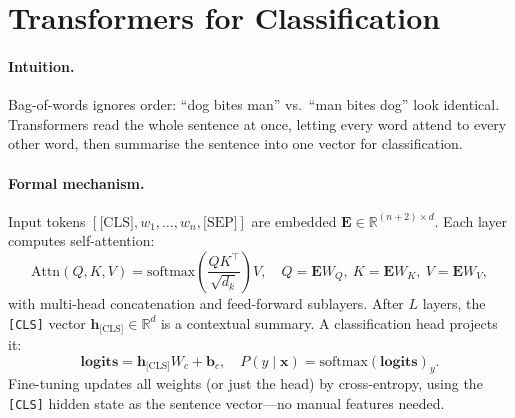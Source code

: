 \section{Transformers for Classification}
\label{sec:transformer-cls}
\paragraph{Intuition.} Bag-of-words ignores order: ``dog bites man'' vs.\ ``man bites dog'' look identical. Transformers read the whole sentence at once, letting every word attend to every other word, then summarise the sentence into one vector for classification.

\paragraph{Formal mechanism.} Input tokens $[ \text{[CLS]}, w_1,\dots,w_n, \text{[SEP]}]$ are embedded $\mathbf{E}\in\mathbb{R}^{(n+2)\times d}$. Each layer computes self-attention:
\begin{equation}
\text{Attn}(Q,K,V)=\text{softmax}\!\left(\frac{QK^\top}{\sqrt{d_k}}\right)V,\quad Q=\mathbf{E}W_Q,\ K=\mathbf{E}W_K,\ V=\mathbf{E}W_V,
\end{equation}
with multi-head concatenation and feed-forward sublayers. After $L$ layers, the \texttt{[CLS]} vector $\mathbf{h}_{\text{[CLS]}}\in\mathbb{R}^d$ is a contextual summary. A classification head projects it:
\begin{equation}
\mathbf{logits}= \mathbf{h}_{\text{[CLS]}}W_c+\mathbf{b}_c,\quad P(y\mid\mathbf{x})=\text{softmax}(\mathbf{logits})_y.
\end{equation}
Fine-tuning updates all weights (or just the head) by cross-entropy, using the \texttt{[CLS]} hidden state as the sentence vector---no manual features needed.

